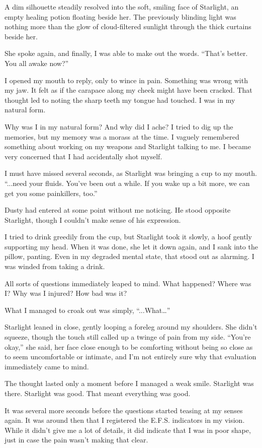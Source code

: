 A dim silhouette steadily resolved into the soft, smiling face of Starlight, an empty healing potion floating beside her. The previously blinding light was nothing more than the glow of cloud-filtered sunlight through the thick curtains beside her.

She spoke again, and finally, I was able to make out the words. “That’s better. You all awake now?”

I opened my mouth to reply, only to wince in pain. Something was wrong with my jaw. It felt as if the carapace along my cheek might have been cracked. That thought led to noting the sharp teeth my tongue had touched. I was in my natural form.

Why was I in my natural form? And why did I ache? I tried to dig up the memories, but my memory was a morass at the time. I vaguely remembered something about working on my weapons and Starlight talking to me. I became very concerned that I had accidentally shot myself.

I must have missed several seconds, as Starlight was bringing a cup to my mouth. “...need your fluids. You’ve been out a while. If you wake up a bit more, we can get you some painkillers, too.”

Dusty had entered at some point without me noticing. He stood opposite Starlight, though I couldn’t make sense of his expression.

I tried to drink greedily from the cup, but Starlight took it slowly, a hoof gently supporting my head. When it was done, she let it down again, and I sank into the pillow, panting. Even in my degraded mental state, that stood out as alarming. I was winded from taking a drink.

All sorts of questions immediately leaped to mind. What happened? Where was I? Why was I injured? How bad was it?

What I managed to croak out was simply, “...What…”

Starlight leaned in close, gently looping a foreleg around my shoulders. She didn’t squeeze, though the touch still called up a twinge of pain from my side. “You’re okay,” she said, her face close enough to be comforting without being so close as to seem uncomfortable or intimate, and I’m not entirely sure why that evaluation immediately came to mind.

The thought lasted only a moment before I managed a weak smile. Starlight was there. Starlight was good. That meant everything was good.

It was several more seconds before the questions started teasing at my senses again. It was around then that I registered the E.F.S. indicators in my vision. While it didn’t give me a lot of details, it did indicate that I was in poor shape, just in case the pain wasn’t making that clear.

